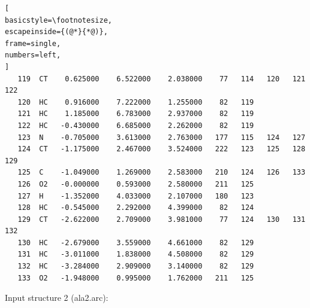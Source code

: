 \documentclass[a4paper,11pt]{scrartcl}
\begin{document}
\begin{lstlisting}[
basicstyle=\footnotesize,
escapeinside={(@*}{*@)},
frame=single,
numbers=left,
]
   119  CT    0.625000    6.522000    2.038000    77   114   120   121   122
   120  HC    0.916000    7.222000    1.255000    82   119
   121  HC    1.185000    6.783000    2.937000    82   119
   122  HC   -0.430000    6.685000    2.262000    82   119
   123  N    -0.705000    3.613000    2.763000   177   115   124   127
   124  CT   -1.175000    2.467000    3.524000   222   123   125   128   129
   125  C    -1.049000    1.269000    2.583000   210   124   126   133
   126  O2   -0.000000    0.593000    2.580000   211   125
   127  H    -1.352000    4.033000    2.107000   180   123
   128  HC   -0.545000    2.292000    4.399000    82   124
   129  CT   -2.622000    2.709000    3.981000    77   124   130   131   132
   130  HC   -2.679000    3.559000    4.661000    82   129
   131  HC   -3.011000    1.838000    4.508000    82   129
   132  HC   -3.284000    2.909000    3.140000    82   129
   133  O2   -1.948000    0.995000    1.762000   211   125

\end{lstlisting}

Input structure 2 (ala2.arc): \newline
\end{document}
